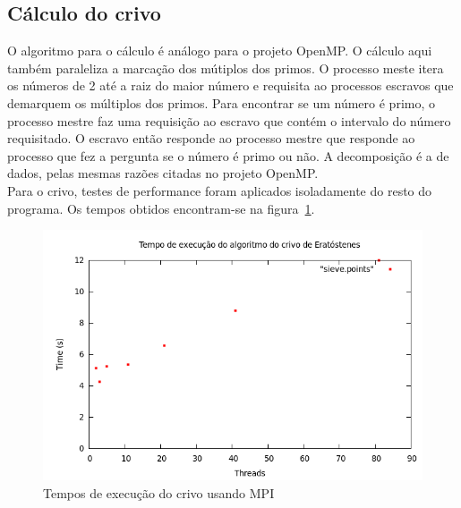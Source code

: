 \documentclass[a4paper]{article}
\begin{document}
\subsection{Cálculo do crivo}
\indent \indent O algoritmo para o cálculo é análogo para o projeto OpenMP. O cálculo aqui também paraleliza a marcação dos mútiplos dos primos. O processo meste itera os números de 2 até a raiz do maior número e requisita ao processos escravos que demarquem os múltiplos dos primos. Para encontrar se um número é primo, o processo mestre faz uma requisição ao escravo que contém o intervalo do número requisitado. O escravo então responde ao processo mestre que responde ao processo que fez a pergunta se o número é primo ou não. A decomposição é a de dados, pelas mesmas razões citadas no projeto OpenMP.\\
\indent Para o crivo, testes de performance foram aplicados isoladamente do resto do programa. Os tempos obtidos encontram-se na figura~\ref{graph-sieve-mpi}.
\begin{figure}[float=p]
	\includegraphics[scale=0.5]{graph-sieve-mpi}
	\caption{Tempos de execução do crivo usando MPI}
	\label{graph-sieve-mpi}
\end{figure}
\end{document}
